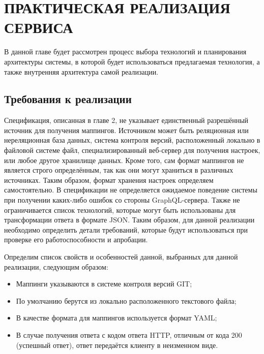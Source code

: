 \chapter{ПРАКТИЧЕСКАЯ РЕАЛИЗАЦИЯ СЕРВИСА}\label{ch:ch3-implementation}

В данной главе будет рассмотрен процесс выбора технологий и планирования архитектуры системы, в которой будет использоваться предлагаемая технология, а также внутренняя архитектура самой реализации.


\section{Требования к реализации}\label{sec:implementation-requirements}

Спецификация, описанная в главе 2, не указывает единственный разрешённый источник для получения маппингов.
Источником может быть реляционная или нереляционная база данных, система контроля версий, расположенный локально в файловой системе файл, специализированный веб-сервер для получения настроек, или любое другое хранилище данных.
Кроме того, сам формат маппингов не является строго определённым, так как они могут храниться в различных источниках.
Таким образом, формат хранения настроек определяем самостоятельно.
В спецификации не определяется ожидаемое поведение системы при получении каких-либо ошибок со стороны GraphQL-сервера.
Также не ограничивается список технологий, которые могут быть использованы для трансформации ответа в формате JSON\@.
Таким образом, для данной реализации необходимо определить детали требований, которые будут использоваться при проверке его работоспособности и апробации.

Определим список свойств и особенностей данной, выбранных для данной реализации, следующим образом:
\begin{itemize}
	\item Маппинги указываются в системе контроля версий GIT;
	\item По умолчанию берутся из локально расположенного текстового файла;
	\item В качестве формата для маппингов используется формат YAML;
	\item В случае получения ответа с кодом ответа HTTP, отличным от кода 200 (успешный ответ), ответ передаётся клиенту в неизменном виде.
\end{itemize}



